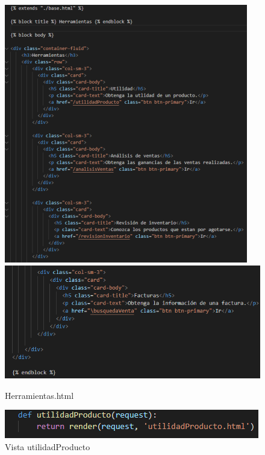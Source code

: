 \documentclass[12pt,letterpaper]{article}
\begin{document}
	\begin{figure}[H]
		\centering
		\includegraphics[scale=0.70]{Documentacion/img/lineasHerramienta.png}
		\includegraphics[scale=0.50]{Documentacion/img/lineasHerramienta2.png}
		\caption{Herramientas.html}
	\end{figure}
	
	\begin{figure}[H]
		\centering
		\includegraphics[scale=0.70]{Documentacion/img/def_utilidad.png}
		\caption{Vista utilidadProducto}
	\end{figure}
	
\end{document}
